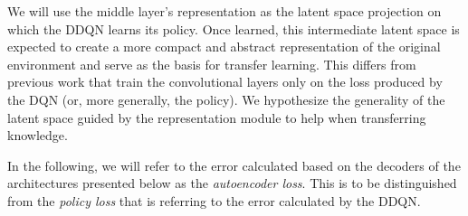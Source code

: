 We will use the middle layer's representation as the latent space projection on which the DDQN learns its policy.
Once learned, this intermediate latent space is expected to create a more compact and abstract representation of the original environment and serve as the basis for transfer learning. This differs from previous work that train the convolutional layers only on the loss produced by the DQN (or, more generally, the policy). We hypothesize the generality of the latent space guided by the representation module to help when transferring knowledge. 

In the following, we will refer to the error calculated based on the decoders of the architectures presented below as the \textit{autoencoder loss}. This is to be distinguished from the \textit{policy loss} that is referring to the error calculated by the DDQN.

